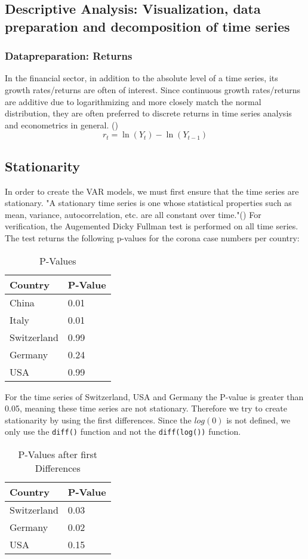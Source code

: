\documentclass[11pt]{article}
\begin{document}
\subsection{Descriptive Analysis: Visualization, data preparation and decomposition of time series}
\subsubsection{Datapreparation: Returns}
In the financial sector, in addition to the absolute level of a time series, its growth rates/returns are often of interest.
Since continuous growth rates/returns are additive due to logarithmizing and more closely match the normal distribution, they are often preferred to discrete returns in time series analysis and econometrics in general. (\cite{PowerPoi49:online})
$$r_{t} =\ln \left(Y_{t}\right)-\ln \left(Y_{t-1}\right)$$

\subsection{Stationarity}
In order to create the VAR models, we must first ensure that the time series are stationary. "A stationary time series is one whose statistical properties such as mean, variance, autocorrelation, etc. are all constant over time."(\cite{Stationa72:online}) For verification, the Augemented Dicky Fullman test is performed on all time series. The test returns the following p-values for the corona case numbers per country:
\begin{table}[h!]
\centering
\caption{P-Values }
\label{tab:p-values-corona}
\begin{tabular}{|l|l|}
\hline
\textbf{Country} & \textbf{P-Value} \\ \hline
China            & 0.01             \\ \hline
Italy            & 0.01             \\ \hline
Switzerland      & 0.99             \\ \hline
Germany          & 0.24             \\ \hline
USA              & 0.99             \\ \hline
\end{tabular}
\end{table}
For the time series of Switzerland, USA and Germany the P-value is greater than 0.05, meaning these time series are not stationary. Therefore we try to create stationarity by using the first differences. Since the $log(0)$ is not defined, we only use the \lstinline{diff()} function and  not the \lstinline{diff(log())} function.
\begin{table}[h!]
\centering
\caption{P-Values after first Differences}
\label{tab:p-values-first-diff}
\begin{tabular}{|l|l|}
\hline
\textbf{Country} & \textbf{P-Value} \\ \hline
Switzerland      & 0.03             \\ \hline
Germany          & 0.02             \\ \hline
USA              & 0.15             \\ \hline
\end{tabular}
\end{table}
\end{document}

